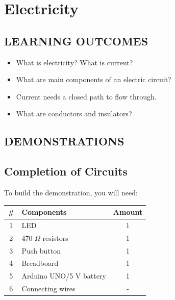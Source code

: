 \chapter{Electricity}

\section*{LEARNING OUTCOMES}
{
\begin{center}
{%
    \parbox{0.95\textwidth}
    {%
        \small
        {
           \begin{itemize}
                \item What is electricity? What is current?
                \item What are main components of an electric circuit?
                \item Current needs a closed path to flow through.
                \item What are conductors and insulators?
            \end{itemize}
        }
    }%
}
\end{center}
}

\section*{DEMONSTRATIONS}
\section*{Completion of Circuits}
To build the demonstration, you will need:

\begin{table}[H]
    \centering
    \begin{tabular}{|c|l|c|}\hline
    \textbf{\#} & \textbf{Components}  &  \textbf{Amount}\\\hline
    1   &   LED                     &   1\\\hline
    2   &   470 $\Omega$ resistors  &   1\\\hline
    3   &   Push button             &   1\\\hline
    4   &   Breadboard              &   1\\\hline
    5   &   Arduino UNO/5 V battery &   1\\\hline
    6   &   Connecting wires        &   -\\\hline
    \end{tabular}
\end{table}

